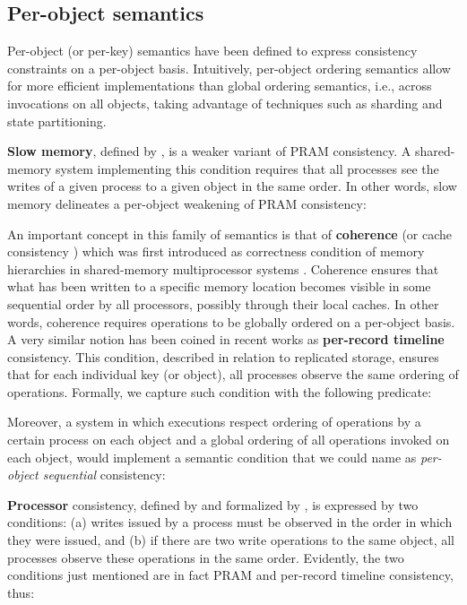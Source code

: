 \documentclass[letter, 11pt]{article}
\newcommand{\citeN}{\citet}
\renewcommand{\cite}{\citep}
\begin{document}
\subsection{Per-object semantics}
\label{subsec:perobject}
Per-object (or per-key) semantics have been defined to express consistency constraints on a per-object basis. Intuitively, per-object ordering semantics allow for more efficient implementations than global ordering semantics, i.e., across invocations on all objects, taking advantage of techniques such as sharding and state partitioning. 

\textbf{Slow memory}, defined by \citeN{Hutto.Ahamad:90}, is a weaker variant of PRAM consistency.
A shared-memory system implementing this condition requires
that all processes see the writes of a given process to a given object in the same order. In other words, slow memory delineates a per-object weakening of PRAM consistency:


An important concept in this family of semantics is that of \textbf{coherence} 
\cite{Gharachorloo.Lenoski.ea:90} (or cache consistency \cite{Goodman:89})
which was first introduced as correctness condition of memory hierarchies in 
shared-memory multiprocessor systems \cite{Dubois.Scheurich.ea:86}.
Coherence ensures that what has been written to a specific memory location becomes visible in some sequential order by all processors, 
possibly through their local caches.
In other words, coherence requires operations to be globally ordered on a per-object basis.
A very similar notion has been coined in recent works \cite{Cooper.Ramakrishnan.ea:08,Lloyd.Freedman.ea:11} 
as \textbf{per-record timeline} consistency.
This condition, described in relation to replicated storage,
ensures that for each individual key (or object), all processes observe the same ordering of operations.
Formally, we capture such condition with the following predicate:


Moreover, a system in which executions respect 
ordering of operations by a certain process on each object and 
a global ordering of all operations invoked on each object,
would implement a semantic condition that we could name as \emph{per-object sequential} consistency:


\textbf{Processor} consistency, defined by \citeN{Goodman:89}
and formalized by \citeN{Ahamad.Bazzi.ea:93}, is expressed by two conditions:
(a) writes issued by a process must be observed in the order in which they were issued, and
(b) if there are two write operations to the same object, 
all processes observe these operations in the same order.
Evidently, the two conditions just mentioned are in fact PRAM and per-record timeline consistency, thus:
\end{document}
